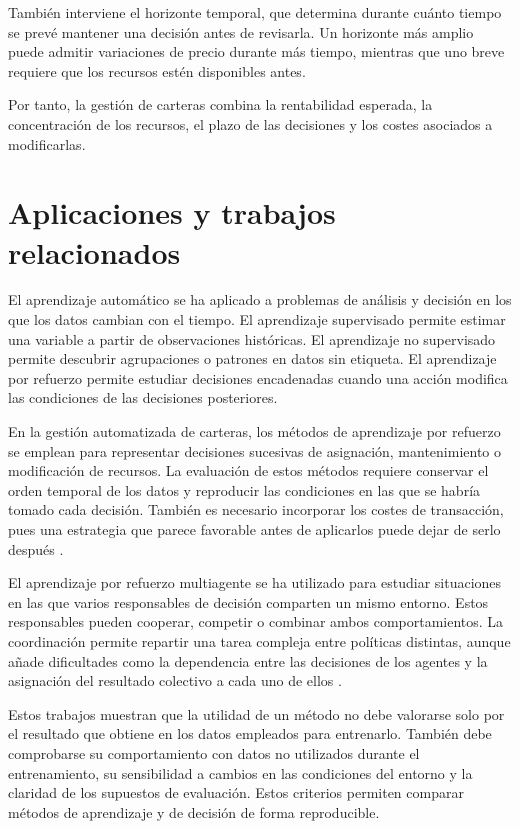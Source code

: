También interviene el horizonte temporal, que determina durante cuánto tiempo se prevé mantener una decisión antes de revisarla. Un horizonte más amplio puede admitir variaciones de precio durante más tiempo, mientras que uno breve requiere que los recursos estén disponibles antes. 

Por tanto, la gestión de carteras combina la rentabilidad esperada, la concentración de los recursos, el plazo de las decisiones y los costes asociados a modificarlas.

\section{Aplicaciones y trabajos relacionados}
\label{sec:estado-arte-aplicaciones}

El aprendizaje automático se ha aplicado a problemas de análisis y decisión en los que los datos cambian con el tiempo. El aprendizaje supervisado permite estimar una variable a partir de observaciones históricas. El aprendizaje no supervisado permite descubrir agrupaciones o patrones en datos sin etiqueta. El aprendizaje por refuerzo permite estudiar decisiones encadenadas cuando una acción modifica las condiciones de las decisiones posteriores.

En la gestión automatizada de carteras, los métodos de aprendizaje por refuerzo se emplean para representar decisiones sucesivas de asignación, mantenimiento o modificación de recursos. La evaluación de estos métodos requiere conservar el orden temporal de los datos y reproducir las condiciones en las que se habría tomado cada decisión. También es necesario incorporar los costes de transacción, pues una estrategia que parece favorable antes de aplicarlos puede dejar de serlo después \cite{liu2021finrl}.

El aprendizaje por refuerzo multiagente se ha utilizado para estudiar situaciones en las que varios responsables de decisión comparten un mismo entorno. Estos responsables pueden cooperar, competir o combinar ambos comportamientos. La coordinación permite repartir una tarea compleja entre políticas distintas, aunque añade dificultades como la dependencia entre las decisiones de los agentes y la asignación del resultado colectivo a cada uno de ellos \cite{lowe2017maddpg,yu2022mappo}.

Estos trabajos muestran que la utilidad de un método no debe valorarse solo por el resultado que obtiene en los datos empleados para entrenarlo. También debe comprobarse su comportamiento con datos no utilizados durante el entrenamiento, su sensibilidad a cambios en las condiciones del entorno y la claridad de los supuestos de evaluación. Estos criterios permiten comparar métodos de aprendizaje y de decisión de forma reproducible.
